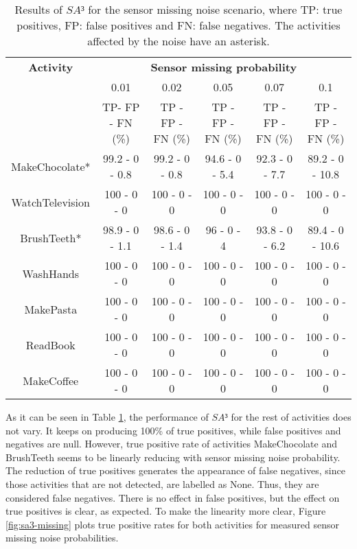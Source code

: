 \begin{table}[htbp]\scriptsize
  \begin{center}
        \begin{tabular}{cccccc}
            \hline            
            \textbf{Activity} & \multicolumn{5}{c}{\textbf{Sensor missing probability}}\\
             & 0.01 & 0.02 & 0.05 & 0.07 & 0.1 \\
             & TP- FP - FN (\%) & TP - FP - FN (\%) & TP - FP - FN (\%) & TP - FP - FN (\%) & TP - FP - FN (\%)\\
            \hline
            MakeChocolate*   & 99.2 - 0 - 0.8 & 99.2 - 0 - 0.8 & 94.6 - 0 - 5.4 & 92.3 - 0 - 7.7 & 89.2 - 0 - 10.8 \\
	    WatchTelevision  & 100 - 0 - 0 & 100 - 0 - 0 & 100 - 0 - 0 & 100 - 0 - 0 & 100 - 0 - 0 \\
	    BrushTeeth*      & 98.9 - 0 - 1.1 & 98.6 - 0 - 1.4 & 96 - 0 - 4 & 93.8 - 0 - 6.2 & 89.4 - 0 - 10.6 \\
	    WashHands        & 100 - 0 - 0 & 100 - 0 - 0 & 100 - 0 - 0 & 100 - 0 - 0 & 100 - 0 - 0 \\
	    MakePasta        & 100 - 0 - 0 & 100 - 0 - 0 & 100 - 0 - 0 & 100 - 0 - 0 & 100 - 0 - 0 \\
	    ReadBook         & 100 - 0 - 0 & 100 - 0 - 0 & 100 - 0 - 0 & 100 - 0 - 0 & 100 - 0 - 0 \\
	    MakeCoffee       & 100 - 0 - 0 & 100 - 0 - 0 & 100 - 0 - 0 & 100 - 0 - 0 & 100 - 0 - 0 \\
            \hline
        \end{tabular}                
        \caption{Results of $SA³$ for the sensor missing noise scenario, where TP: true positives, FP: false positives and FN: false negatives. The activities affected by the noise have an asterisk.}
        \label{tab-sa3-missing}
    \end{center}
\end{table}

As it can be seen in Table \ref{tab-sa3-missing}, the performance of $SA³$ for the rest of activities does not vary. It keeps on producing 100\% of true positives, while false positives and negatives are null. However, true positive rate of activities MakeChocolate and BrushTeeth seems to be linearly reducing with sensor missing noise probability. The reduction of true positives generates the appearance of false negatives, since those activities that are not detected, are labelled as None. Thus, they are considered false negatives. There is no effect in false positives, but the effect on true positives is clear, as expected. To make the linearity more clear, Figure \ref{fig:sa3-missing} plots true positive rates for both activities for measured sensor missing noise probabilities. 

